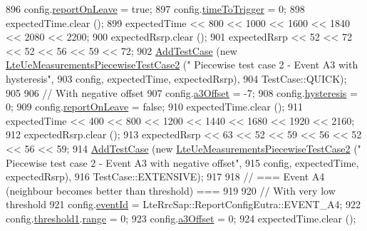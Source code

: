 \begin{DoxyCode}
896   config.\hyperlink{structns3_1_1LteRrcSap_1_1ReportConfigEutra_a1463979cc3e1e6165cfd1ed8d5bc8547}{reportOnLeave} = \textcolor{keyword}{true};
897   config.\hyperlink{structns3_1_1LteRrcSap_1_1ReportConfigEutra_aee64b76b166b1beda5bbe1760363ed24}{timeToTrigger} = 0;
898   expectedTime.clear ();
899   expectedTime << 800 << 1000 << 1600 << 1840 << 2080 << 2200;
900   expectedRsrp.clear ();
901   expectedRsrp << 52 << 72 << 52 << 56 << 59 << 72;
902   \hyperlink{classns3_1_1TestCase_a3718088e3eefd5d6454569d2e0ddd835}{AddTestCase} (\textcolor{keyword}{new} \hyperlink{classLteUeMeasurementsPiecewiseTestCase2}{LteUeMeasurementsPiecewiseTestCase2} (\textcolor{stringliteral}{"
      Piecewise test case 2 - Event A3 with hysteresis"},
903                                                         config, expectedTime, expectedRsrp),
904                TestCase::QUICK);
905 
906   \textcolor{comment}{// With negative offset}
907   config.\hyperlink{structns3_1_1LteRrcSap_1_1ReportConfigEutra_ae3226d3c9ec9988fefee04790ac6c9f6}{a3Offset} = -7;
908   config.\hyperlink{structns3_1_1LteRrcSap_1_1ReportConfigEutra_a1fb9169ea261ba20af6a0c18fcc04fa9}{hysteresis} = 0;
909   config.\hyperlink{structns3_1_1LteRrcSap_1_1ReportConfigEutra_a1463979cc3e1e6165cfd1ed8d5bc8547}{reportOnLeave} = \textcolor{keyword}{false};
910   expectedTime.clear ();
911   expectedTime << 400 << 800 << 1200 << 1440 << 1680 << 1920 << 2160;
912   expectedRsrp.clear ();
913   expectedRsrp << 63 << 52 << 59 << 56 << 52 << 56 << 59;
914   \hyperlink{classns3_1_1TestCase_a3718088e3eefd5d6454569d2e0ddd835}{AddTestCase} (\textcolor{keyword}{new} \hyperlink{classLteUeMeasurementsPiecewiseTestCase2}{LteUeMeasurementsPiecewiseTestCase2} (\textcolor{stringliteral}{"
      Piecewise test case 2 - Event A3 with negative offset"},
915                                                         config, expectedTime, expectedRsrp),
916                TestCase::EXTENSIVE);
917 
918   \textcolor{comment}{// === Event A4 (neighbour becomes better than threshold) ===}
919 
920   \textcolor{comment}{// With very low threshold}
921   config.\hyperlink{structns3_1_1LteRrcSap_1_1ReportConfigEutra_a1fbe931cc9584614d20f4affbce70d8a}{eventId} = LteRrcSap::ReportConfigEutra::EVENT\_A4;
922   config.\hyperlink{structns3_1_1LteRrcSap_1_1ReportConfigEutra_a8f36bc45a61054920e490be8bf33b4ca}{threshold1}.\hyperlink{structns3_1_1LteRrcSap_1_1ThresholdEutra_abd4950e20a1a93727535e8364bf85b03}{range} = 0;
923   config.\hyperlink{structns3_1_1LteRrcSap_1_1ReportConfigEutra_ae3226d3c9ec9988fefee04790ac6c9f6}{a3Offset} = 0;
924   expectedTime.clear ();

\end{DoxyCode}
